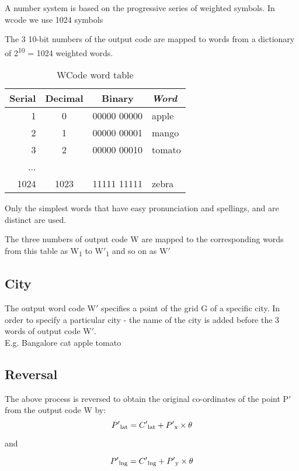 \documentclass[conference]{IEEEtran}
\begin{document}
A number system is based on the progressive series of weighted symbols.
In wcode we use 1024 symbols

The 3 10-bit numbers of the output code are mapped to words from a dictionary of 2\textsuperscript{10} = 1024 weighted words.
\begin{table}[h!]
\caption{WCode word table} \begin{center}
\bgroup
\def\arraystretch{1.4}%
\begin{tabular}{r|c|c|l}
\textbf{Serial} & \textbf{Decimal} & \textbf{Binary} & \textbf{\textit{Word}} \\
\hline
1 & 0 & 00000 00000 & apple\\
\hline
2 & 1 & 00000 00001 & mango \\
\hline
3 & 2 & 00000 00010 & tomato \\
... & & & \\
1024 & 1023 & 11111 11111 & zebra
\end{tabular}
\egroup
\end{center} \end{table}

Only the simplest words that have easy pronunciation and spellings, and are distinct are used.

The three numbers of output code W are mapped to the corresponding words from this table as W\textsubscript{1} to W$'$\textsubscript{1} and so on as W$'$
\subsection{City}
The output word code W$'$ specifies a point of the grid G of a specific city. In order to specify a particular city - the name of the city is added before the 3 words of output code W$'$.\\

E.g. Bangalore cat apple tomato

\subsection{Reversal}\label{AA}
The above process is reversed to obtain the original co-ordinates of the point P$'$ from the output code W by:
\begin{equation}P'\textsubscript{lat} = C'\textsubscript{lat} +  P'\textsubscript{x} \times {\theta}\end{equation}

and

\begin{equation}P'\textsubscript{lng} = C'\textsubscript{lng} + P'\textsubscript{y} \times \theta\end{equation}
\end{document}
